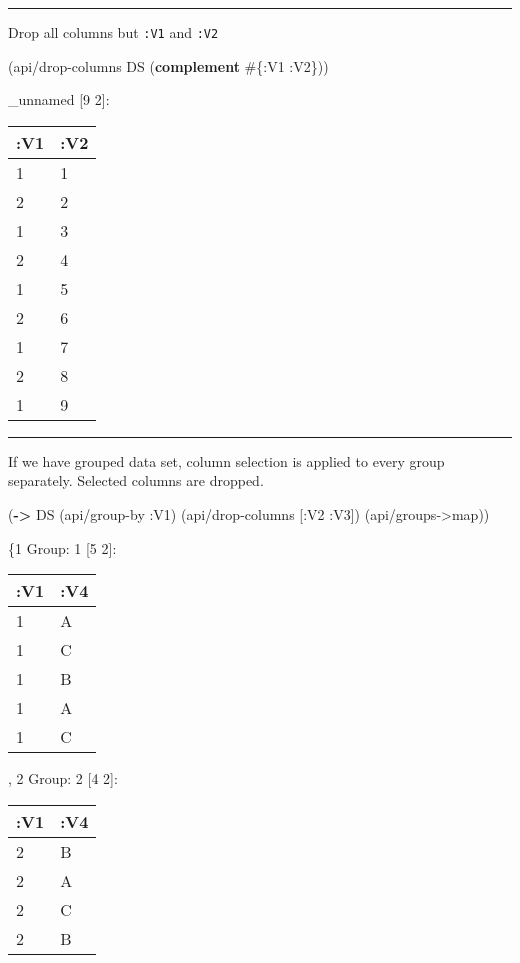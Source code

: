\documentclass[]{article}
\newenvironment{Shaded}{\begin{snugshade}}{\end{snugshade}}
\newcommand{\KeywordTok}[1]{\textcolor[rgb]{0.13,0.29,0.53}{\textbf{#1}}}
\newcommand{\AttributeTok}[1]{\textcolor[rgb]{0.77,0.63,0.00}{#1}}
\newcommand{\NormalTok}[1]{#1}
\begin{document}
\begin{center}\rule{0.5\linewidth}{0.5pt}\end{center}

Drop all columns but \texttt{:V1} and \texttt{:V2}

\begin{Shaded}
\begin{Highlighting}[]
\NormalTok{(api/drop-columns DS (}\KeywordTok{complement}\NormalTok{ #\{}\AttributeTok{:V1} \AttributeTok{:V2}\NormalTok{\}))}
\end{Highlighting}
\end{Shaded}

\_unnamed {[}9 2{]}:

\begin{longtable}[]{@{}ll@{}}
\toprule
:V1 & :V2\tabularnewline
\midrule
\endhead
1 & 1\tabularnewline
2 & 2\tabularnewline
1 & 3\tabularnewline
2 & 4\tabularnewline
1 & 5\tabularnewline
2 & 6\tabularnewline
1 & 7\tabularnewline
2 & 8\tabularnewline
1 & 9\tabularnewline
\bottomrule
\end{longtable}

\begin{center}\rule{0.5\linewidth}{0.5pt}\end{center}

If we have grouped data set, column selection is applied to every group
separately. Selected columns are dropped.

\begin{Shaded}
\begin{Highlighting}[]
\NormalTok{(}\KeywordTok{->}\NormalTok{ DS}
\NormalTok{    (api/group-by }\AttributeTok{:V1}\NormalTok{)}
\NormalTok{    (api/drop-columns [}\AttributeTok{:V2} \AttributeTok{:V3}\NormalTok{])}
\NormalTok{    (api/groups->map))}
\end{Highlighting}
\end{Shaded}

\{1 Group: 1 {[}5 2{]}:

\begin{longtable}[]{@{}ll@{}}
\toprule
:V1 & :V4\tabularnewline
\midrule
\endhead
1 & A\tabularnewline
1 & C\tabularnewline
1 & B\tabularnewline
1 & A\tabularnewline
1 & C\tabularnewline
\bottomrule
\end{longtable}

, 2 Group: 2 {[}4 2{]}:

\begin{longtable}[]{@{}ll@{}}
\toprule
:V1 & :V4\tabularnewline
\midrule
\endhead
2 & B\tabularnewline
2 & A\tabularnewline
2 & C\tabularnewline
2 & B\tabularnewline
\bottomrule
\end{longtable}
\end{document}
